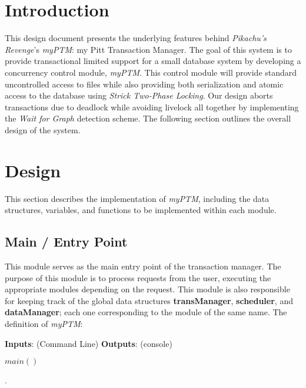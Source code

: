 \documentclass[12pt]{article}
\newcommand{\tab}{\hspace*{3em}}
\begin{document}
 \maketitle

\section{Introduction} 

This design document presents the underlying features behind \textit{Pikachu's Revenge}'s \textit{myPTM}: my Pitt Transaction Manager. The goal of this system is to provide transactional limited support for a small database system by developing a concurrency control module, \textit{myPTM}. This control module will provide standard uncontrolled access to files while also providing both serialization and atomic access to the database using \textit{Strick Two-Phase Locking}. Our design aborts transactions due to deadlock while avoiding livelock all together by implementing the \textit{Wait for Graph} detection scheme. The following section outlines the overall design of the system.

\section{Design}

This section describes the implementation of \textit{myPTM}, including the data structures, variables, and functions to be implemented within each module.

\subsection{Main / Entry Point}

This module serves as the main entry point of the transaction manager. The purpose of this module is to process requests from the user, executing the appropriate modules depending on the request. This module is also responsible for keeping track of the global data structures \textbf{transManager}, \textbf{scheduler}, and \textbf{dataManager}; each one corresponding to the module of the same name. The definition of \textit{myPTM}:
\\
\begin{algorithmic}[1]

    \STATE \textbf{Inputs}: (Command Line)
    \STATE \tab{list of script files}
    \STATE \tab{bufferSize}
     \STATE \tab{seed = random number generator}
     \STATE \tab{numBufferPages}
     \STATE \tab{readMode (0 = round robin, 1 = random}
      \STATE \tab{searchMode (0 = scan, 1 = hash)}
      \STATE \textbf{Outputs}: (console)
       \STATE \tab{numCommitted = \# of committed transactions}
        \STATE \tab{percentRead = \% of read operations}
         \STATE \tab{percentWrite = \% of write operations}
    	 \STATE \tab{avgResponseTime = average response time}
	
	\STATE \textbf{ $main()$ }   \\
    
\end{algorithmic}  .\\
\end{document}
